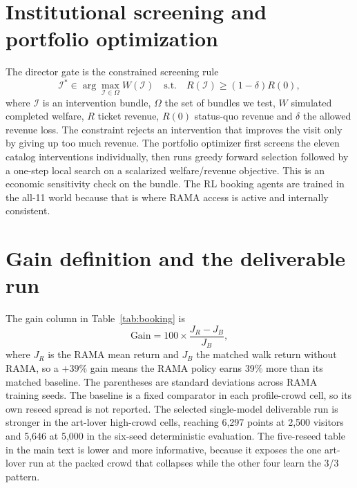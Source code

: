 \documentclass[11pt]{article}
\begin{document}
\section{Institutional screening and portfolio optimization}
\label{app:gate}

The director gate is the constrained screening rule
\[
\mathcal I^*\in\arg\max_{\mathcal I\in\Omega} W(\mathcal I)
\quad\text{s.t.}\quad R(\mathcal I)\ge (1-\delta)R(0),
\]
where $\mathcal I$ is an intervention bundle, $\Omega$ the set of bundles we test, $W$ simulated
completed welfare, $R$ ticket revenue, $R(0)$ status-quo revenue and $\delta$ the allowed revenue loss.
The constraint rejects an intervention that improves the visit only by giving up too much revenue. The
portfolio optimizer first screens the eleven catalog interventions individually, then runs greedy
forward selection followed by a one-step local search on a scalarized welfare/revenue objective. This
is an economic sensitivity check on the bundle. The RL booking agents are trained in the all-11 world
because that is where RAMA access is active and internally consistent.

\section{Gain definition and the deliverable run}
\label{app:results}

The gain column in Table~\ref{tab:booking} is
\[
\text{Gain}=100\times\frac{J_{R}-J_{B}}{J_{B}},
\]
where $J_R$ is the RAMA mean return and $J_B$ the matched walk return without RAMA, so a $+39\%$ gain
means the RAMA policy earns 39\% more than its matched baseline. The parentheses are standard
deviations across RAMA training seeds. The baseline is a fixed comparator in each profile-crowd cell,
so its own reseed spread is not reported. The selected single-model deliverable run is stronger in the
art-lover high-crowd cells, reaching 6,297 points at 2,500 visitors and 5,646 at 5,000 in the six-seed
deterministic evaluation. The five-reseed table in the main text is lower and more informative, because
it exposes the one art-lover run at the packed crowd that collapses while the other four learn the 3/3
pattern.
\end{document}
